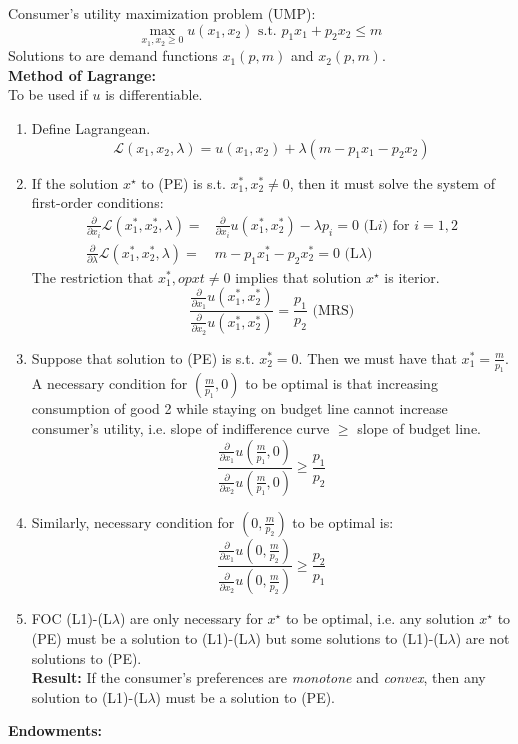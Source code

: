 \documentclass[12pt]{article}
\newcommand{\Lag}{\mathcal{L}}
\newcommand{\opxo}{x^{\ast}_1}
\newcommand{\opxt}{x^{\ast}_2}
\newcommand{\di}{\partial}
\begin{document}
\noindent
Consumer's utility maximization problem (UMP):
\[\max_{x_1, x_2 \geq 0} u(x_1, x_2) \text{ s.t. } p_1x_1 + p_2x_2 \leq m\]
\noindent
Solutions to are demand functions $x_1(p, m)$ and $x_2(p, m)$. \\

\clearpage
\noindent
\textbf{Method of Lagrange:}\\

\noindent
To be used if $u$ is differentiable. 
\begin{enumerate}
	\item Define Lagrangean.
	\[ \Lag(x_1, x_2, \lambda) = u(x_1, x_2) + \lambda(m-p_1x_1-p_2x_2)
	    \]
	\item If the solution $x^{\star}$ to (PE) is s.t. $\opxo, \opxt \ne 0$, then it must solve the system of first-order conditions:
   \begin{align*}
    \frac{\di}{\di x_i}  \Lag(\opxo, \opxt, \lambda) =& \frac{\di}{\di x_i}u(\opxo, \opxt) - \lambda p_i = 0  \text{ (L}i)\text{ for } i = 1, 2\\
	 \frac{\di}{\di \lambda} \Lag(\opxo, \opxt, \lambda) =& m - p_1\opxo - p_2\opxt = 0  \text{ (L}\lambda)	
  \end{align*}
	The restriction that $\opxo, opxt \ne 0$ implies that solution $x^{\star}$ is iterior.\\
	\[
	\frac{\frac{\di}{\di x_1}u(\opxo, \opxt)}{\frac{\di}{\di x_2}u(\opxo, \opxt)} = \frac{p_1}{p_2} \text{ (MRS)}
	\]
	\item Suppose that solution to (PE) is s.t. $\opxt = 0$. Then we must have that $\opxo = \frac{m}{p_1}$. \\
	A necessary condition for $(\frac{m}{p_1}, 0)$ to be optimal is that increasing consumption of good 2 while staying on budget line cannot increase consumer's utility, i.e. slope of indifference curve $\geq$ slope of budget line. 
	\[
		\frac{\frac{\di}{\di x_1}u(\frac{m}{p_1}, 0)}{\frac{\di}{\di x_2}u(\frac{m}{p_1}, 0)} \geq \frac{p_1}{p_2} 
	\]
	\item Similarly, necessary condition for $(0, \frac{m}{p_2})$ to be optimal is:
		\[
	\frac{\frac{\di}{\di x_1}u(0, \frac{m}{p_2})}{\frac{\di}{\di x_2}u(0, \frac{m}{p_2})} \geq \frac{p_2}{p_1} 
	\] 
	\item FOC (L1)-(L$\lambda$) are only necessary for $x^{\star}$ to be optimal, i.e. any solution $x^{\star}$ to (PE) must be a solution to  (L1)-(L$\lambda$) but some solutions to  (L1)-(L$\lambda$)  are not solutions to (PE).\\
   \textbf{Result:} If the consumer's preferences are \emph{monotone} and \emph{convex}, then any solution to  (L1)-(L$\lambda$) must be a solution to (PE). 
\end{enumerate}
\noindent
\textbf{Endowments:}\\
\end{document}
